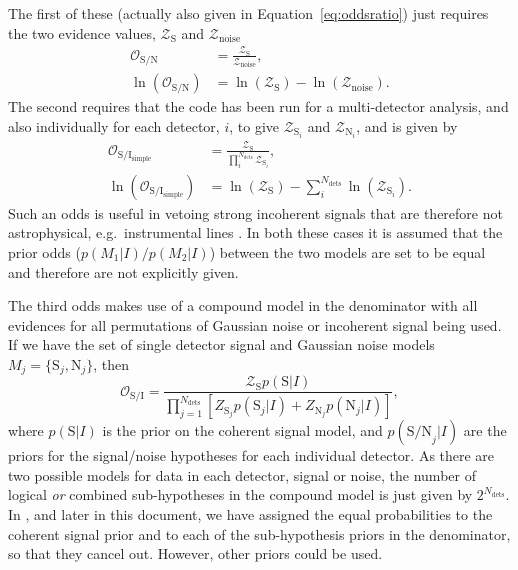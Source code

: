 The first of these (actually also given in Equation~\ref{eq:oddsratio}) just requires the two evidence values, $\mathcal{Z}_{\text{S}}$ and $\mathcal{Z}_{\text{noise}}$
\begin{align}\label{eq:sigvsnoise}
 \mathcal{O}_{\text{S}/\text{N}} &= \frac{\mathcal{Z}_{\text{S}}}{\mathcal{Z}_{\text{noise}}}, \nonumber \\
 \ln{\left(\mathcal{O}_{\text{S}/\text{N}}\right)} &= \ln{\left(\mathcal{Z}_{\text{S}}\right)} - \ln{\left({\mathcal{Z}_{\text{noise}}}\right)}.
\end{align}
The second requires that the code has been run for a multi-detector analysis, and also individually for each detector, $i$, to give $\mathcal{Z}_{\text{S}_i}$
and $\mathcal{Z}_{\text{N}_i}$, and is given by
\begin{align}\label{eq:cohvincoh1}
 \mathcal{O}_{\text{S}/\text{I}_{\text{simple}}} &= \frac{\mathcal{Z}_{\text{S}}}{\prod_i^{N_{\text{dets}}} \mathcal{Z}_{\text{S}_i}}, \nonumber \\
 \ln{\left(\mathcal{O}_{\text{S}/\text{I}_{\text{simple}}}\right)} &= \ln{\left(\mathcal{Z}_{\text{S}}\right)} - \sum_i^{N_{\text{dets}}}\ln{\left(\mathcal{Z}_{\text{S}_i}\right)}.
\end{align}
Such an odds is useful in vetoing strong incoherent signals that are therefore not astrophysical, e.g.\ instrumental lines \citep[see, e.g., the similar
line-robust statistic defined in][]{2014PhRvD..89f4023K}. In both these cases it is assumed
that the prior odds ($p(M_1|I)/p(M_2|I)$) between the two models are set to be equal and therefore are not explicitly given.

The third odds makes use of a compound model in the denominator with all evidences for all permutations of Gaussian noise or incoherent signal being used.
If we have the set of single detector signal and Gaussian noise models $M_j = \{\text{S}_j, \text{N}_j\}$, then \citep[see, e.g., Equation~50 of][]{MaxCWpolariations}
\begin{equation}\label{eq:cohvincoh2}
 \mathcal{O}_{\text{S}/\text{I}} = \frac{\mathcal{Z}_{\text{S}}p(\text{S}|I)}{\prod_{j=1}^{N_{\text{dets}}}\left[ Z_{\text{S}_j}p(\text{S}_j|I) + Z_{\text{N}_j}p(\text{N}_j|I) \right]},
\end{equation}
where $p(\text{S}|I)$ is the prior on the coherent signal model, and $p(\text{S/N}_j|I)$ are the priors for the signal/noise hypotheses for each individual detector.
As there are two possible models for data in each detector, signal or noise, the number of logical {\it or} combined sub-hypotheses \citep[see, e.g., the four sub-hypotheses
used in Equation~A6 of][where the priors in the denominator are the combinations that would be given from expanding out equation~\ref{eq:cohvincoh2}]{2017arXiv170107709T}
in the compound model is just given by $2^{N_{\text{dets}}}$. In \citet{2017arXiv170107709T}, and later in this 
document, we have assigned the equal probabilities to the coherent signal prior
and to each of the sub-hypothesis priors in the denominator, so that they cancel out. However, other priors could be used.

